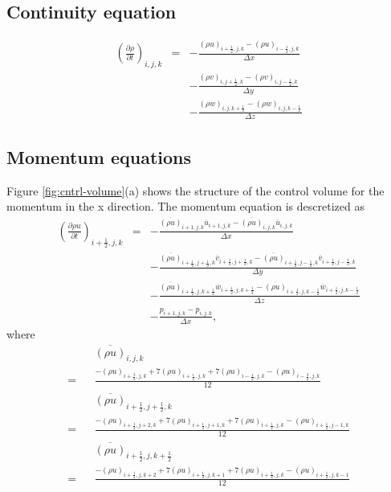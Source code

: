 \subsection{Continuity equation}
\begin{eqnarray}
\left(\frac{\partial \rho}{\partial t}\right)_{i,j,k}
&=& - \frac{(\rho u)_{i+\frac{1}{2},j,k} -(\rho u)_{i-\frac{1}{2},j,k}}{\Delta x}\nonumber\\
& & - \frac{(\rho v)_{i,j+\frac{1}{2},k} -(\rho v)_{i,j-\frac{1}{2},k}}{\Delta y}\nonumber\\
& & - \frac{(\rho w)_{i,j,k+\frac{1}{2}} -(\rho w)_{i,j,k-\frac{1}{2}}}{\Delta z}
\end{eqnarray}

\subsection{Momentum equations}
Figure \ref{fig:cntrl-volume}(a) shows the structure of the control volume for the momentum
in the x direction.
The momentum equation is descretized as
\begin{eqnarray}
\left(\frac{\partial \rho u}{\partial t}\right)_{i+\frac{1}{2},j,k}
&=& - \frac{\overline{(\rho u)}_{i+1,j,k} \overline{u}_{i+1,j,k} 
           -\overline{(\rho u)}_{i,j,k} \overline{u}_{i,j,k}}
     {\Delta x}\nonumber\\
& & - \frac{\overline{(\rho u)}_{i+\frac{1}{2},j+\frac{1}{2},k}  \overline{v}_{i+\frac{1}{2},j+\frac{1}{2},k} 
           -\overline{(\rho u)}_{i+\frac{1}{2},j-\frac{1}{2},k}  \overline{v}_{i+\frac{1}{2},j-\frac{1}{2},k}}
     {\Delta y}\nonumber\\
& & - \frac{\overline{(\rho u)}_{i+\frac{1}{2},j,k+\frac{1}{2}}  \overline{w}_{i+\frac{1}{2},j,k+\frac{1}{2}} 
           -\overline{(\rho u)}_{i+\frac{1}{2},j,k-\frac{1}{2}}  \overline{w}_{i+\frac{1}{2},j,k-\frac{1}{2}}}
     {\Delta z}\nonumber\\
& & -\frac{p_{i+1,j,k}-p_{i,j,k}}{\Delta x},
\end{eqnarray}
where 
\begin{eqnarray}
&& \overline{(\rho u)}_{i,j,k} \nonumber\\
= && \frac{-(\rho u)_{i+\frac{3}{2},j,k}+7(\rho u)_{i+\frac{1}{2},j,k}+7(\rho u)_{i-\frac{1}{2},j,k}-(\rho u)_{i-\frac{3}{2},j,k}}{12}\\
&& \overline{(\rho u)}_{i+\frac{1}{2},j+\frac{1}{2},k} \nonumber\\
= && \frac{-(\rho u)_{i+\frac{1}{2},j+2,k}+7(\rho u)_{i+\frac{1}{2},j+1,k}+7(\rho u)_{i+\frac{1}{2},j,k}-(\rho u)_{i+\frac{1}{2},j-1,k}}{12}\\
&& \overline{(\rho u)}_{i+\frac{1}{2},j,k+\frac{1}{2}} \nonumber\\
= &&\frac{-(\rho u)_{i+\frac{1}{2},j,k+2}+7(\rho u)_{i+\frac{1}{2},j,k+1}+7(\rho u)_{i+\frac{1}{2},j,k}-(\rho u)_{i+\frac{1}{2},j,k-1}}{12}
\end{eqnarray}
